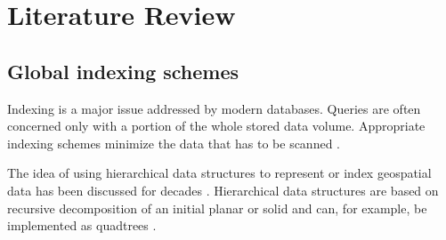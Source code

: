 \documentclass[a4paper,10pt]{article}
\begin{document}
%
%
%

\section{Literature Review}
\subsection{Global indexing schemes}
\label{lit_index}
Indexing is a major issue addressed by modern databases. 
Queries are often concerned only with a portion of the whole stored data volume.
Appropriate indexing schemes minimize the data that has to be scanned \citep{Kunszt2000}.

The idea of using hierarchical data structures to represent or index geospatial data has been discussed for decades \citep{Dutton1996, Samet1988}.
Hierarchical data structures are based on recursive decomposition of an initial planar or solid and can, for example, be implemented as quadtrees \citep{Samet1988}.
\end{document}
